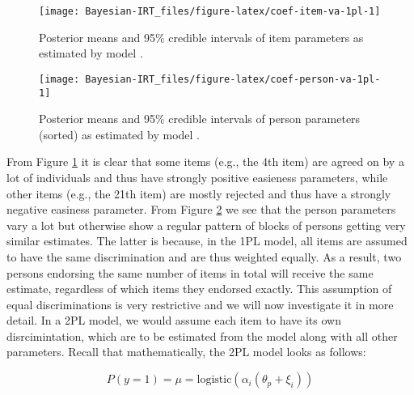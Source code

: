 \documentclass[jss]{jss}
\begin{document}
\begin{CodeChunk}
\begin{figure}

{\centering \texttt{[image: Bayesian-IRT\_files/figure-latex/coef-item-va-1pl-1]} 

}

\caption[Posterior means and 95\% credible intervals of item parameters as estimated by model ]{Posterior means and 95\% credible intervals of item parameters as estimated by model .}\label{fig:coef-item-va-1pl}
\end{figure}
\end{CodeChunk}

\begin{CodeChunk}
\begin{figure}

{\centering \texttt{[image: Bayesian-IRT\_files/figure-latex/coef-person-va-1pl-1]} 

}

\caption[Posterior means and 95\% credible intervals of person parameters (sorted) as estimated by model ]{Posterior means and 95\% credible intervals of person parameters (sorted) as estimated by model .}\label{fig:coef-person-va-1pl}
\end{figure}
\end{CodeChunk}

From Figure \ref{fig:coef-item-va-1pl} it is clear that some items
(e.g., the 4th item) are agreed on by a lot of individuals and thus have
strongly positive easieness parameters, while other items (e.g., the
21th item) are mostly rejected and thus have a strongly negative
easiness parameter. From Figure \ref{fig:coef-person-va-1pl} we see that
the person parameters vary a lot but otherwise show a regular pattern of
blocks of persons getting very similar estimates. The latter is because,
in the 1PL model, all items are assumed to have the same discrimination
and are thus weighted equally. As a result, two persons endorsing the
same number of items in total will receive the same estimate, regardless
of which items they endorsed exactly. This assumption of equal
discriminations is very restrictive and we will now investigate it in
more detail. In a 2PL model, we would assume each item to have its own
disrcimintation, which are to be estimated from the model along with all
other parameters. Recall that mathematically, the 2PL model looks as
follows:

\[
P(y = 1) = \mu = \text{logistic}(\alpha_i (\theta_p + \xi_i))
\]
\end{document}
